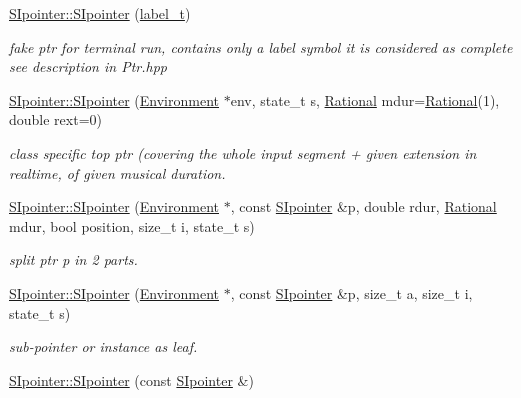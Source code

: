 \begin{DoxyCompactItemize}
\mbox{\label{group__table_ga464163b749ecd94516ab6e94f7baa5bf}} 
\mbox{\hyperlink{group__table_ga464163b749ecd94516ab6e94f7baa5bf}{S\+Ipointer\+::\+S\+Ipointer}} (\mbox{\hyperlink{group__output_ga22fde970e635fcf63962743b2d5c441d}{label\+\_\+t}})
\begin{DoxyCompactList}\small\item\em fake ptr for terminal run, contains only a label symbol it is considered as complete see description in Ptr.\+hpp \end{DoxyCompactList}\item 
\mbox{\hyperlink{group__table_gac560506e7bf1439877178cf6d2459e7f}{S\+Ipointer\+::\+S\+Ipointer}} (\mbox{\hyperlink{classEnvironment}{Environment}} $\ast$env, state\+\_\+t s, \mbox{\hyperlink{classRational}{Rational}} mdur=\mbox{\hyperlink{classRational}{Rational}}(1), double rext=0)
\begin{DoxyCompactList}\small\item\em class specific top ptr (covering the whole input segment + given extension in realtime, of given musical duration. \end{DoxyCompactList}\item 
\mbox{\hyperlink{group__table_ga3abe73f8e3188ca49f11e09d794f1f05}{S\+Ipointer\+::\+S\+Ipointer}} (\mbox{\hyperlink{classEnvironment}{Environment}} $\ast$, const \mbox{\hyperlink{classSIpointer}{S\+Ipointer}} \&p, double rdur, \mbox{\hyperlink{classRational}{Rational}} mdur, bool position, size\+\_\+t i, state\+\_\+t s)
\begin{DoxyCompactList}\small\item\em split ptr p in 2 parts. \end{DoxyCompactList}\item 
\mbox{\hyperlink{group__table_gab5c8a8654ef626d4c7b75ef67ed28aa9}{S\+Ipointer\+::\+S\+Ipointer}} (\mbox{\hyperlink{classEnvironment}{Environment}} $\ast$, const \mbox{\hyperlink{classSIpointer}{S\+Ipointer}} \&p, size\+\_\+t a, size\+\_\+t i, state\+\_\+t s)
\begin{DoxyCompactList}\small\item\em sub-\/pointer or instance as leaf. \end{DoxyCompactList}\item 
\mbox{\label{group__table_ga3df3168789d247e497f127caa7840e88}} 
\mbox{\hyperlink{group__table_ga3df3168789d247e497f127caa7840e88}{S\+Ipointer\+::\+S\+Ipointer}} (const \mbox{\hyperlink{classSIpointer}{S\+Ipointer}} \&)

\end{DoxyCompactItemize}
